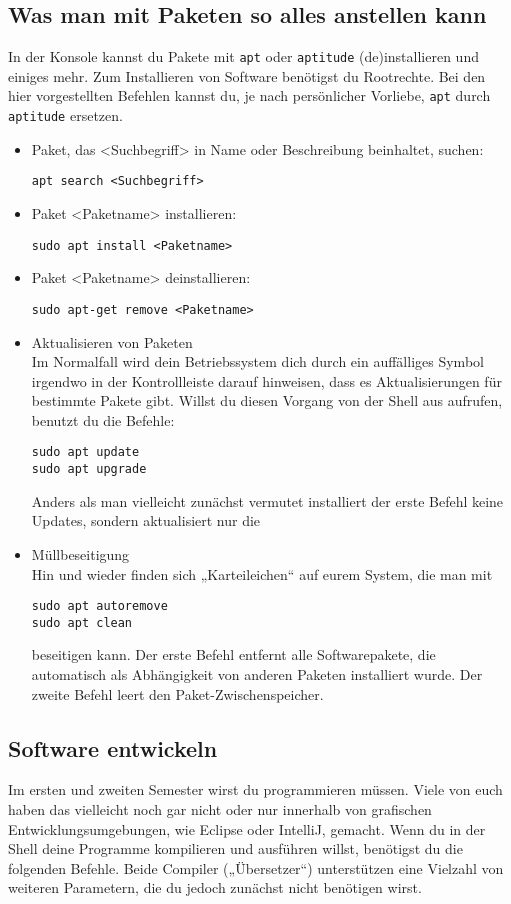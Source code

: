 \documentclass[a4paper,12pt]{article}
\begin{document}
\subsection{Was man mit Paketen so alles anstellen kann}
 In der Konsole kannst du Pakete mit \texttt{apt} oder \texttt{aptitude} (de)installieren 
und einiges mehr. Zum Installieren von Software benötigst du Rootrechte. 
Bei den hier vorgestellten Befehlen kannst du, je nach persönlicher Vorliebe,  
\texttt{apt} durch \texttt{aptitude} ersetzen.
\begin{itemize}
\item Paket, das <Suchbegriff> in Name oder Beschreibung beinhaltet, suchen: 
\begin{lstlisting}
apt search <Suchbegriff>
\end{lstlisting} 
\item Paket <Paketname> installieren:
\begin{lstlisting}
sudo apt install <Paketname>
\end{lstlisting} 
\item Paket <Paketname> deinstallieren:
\begin{lstlisting}
sudo apt-get remove <Paketname>
\end{lstlisting} 
\item Aktualisieren von Paketen \\
Im Normalfall wird dein Betriebssystem dich durch ein auffälliges Symbol irgendwo 
in der Kontrollleiste darauf hinweisen, dass es Aktualisierungen für bestimmte 
Pakete gibt. Willst du diesen Vorgang von der Shell aus aufrufen, benutzt 
du die Befehle:
\begin{lstlisting}
sudo apt update
sudo apt upgrade
\end{lstlisting} 
Anders als man vielleicht zunächst vermutet installiert der erste Befehl keine Updates, sondern aktualisiert nur die 
\item Müllbeseitigung \\
Hin und wieder finden sich „Karteileichen“ auf eurem System, die man mit
\begin{lstlisting}
sudo apt autoremove
sudo apt clean
\end{lstlisting} 
beseitigen kann. Der erste Befehl entfernt alle Softwarepakete, die automatisch als Abhängigkeit von anderen Paketen installiert wurde. Der zweite Befehl leert den Paket-Zwischenspeicher.
\end{itemize}

\subsection{Software entwickeln}
Im ersten und zweiten Semester wirst du programmieren müssen. Viele von 
euch haben das vielleicht noch gar nicht oder nur innerhalb von grafischen
Entwicklungsumgebungen, wie Eclipse oder IntelliJ, gemacht. Wenn du in 
der Shell deine Programme kompilieren und ausführen willst, benötigst du 
die folgenden Befehle. Beide Compiler („Übersetzer“) unterstützen eine Vielzahl von
weiteren Parametern, die du jedoch zunächst nicht benötigen wirst.
\end{document}

